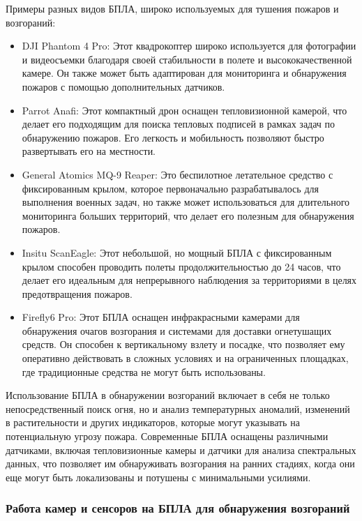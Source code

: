 Примеры разных видов БПЛА, широко используемых для тушения пожаров и возгораний:
\begin{itemize}
	\item DJI Phantom 4 Pro: Этот квадрокоптер широко используется для фотографии и видеосъемки благодаря своей стабильности в полете и высококачественной камере. Он также может быть адаптирован для мониторинга и обнаружения пожаров с помощью дополнительных датчиков.
	\item Parrot Anafi: Этот компактный дрон оснащен тепловизионной камерой, что делает его подходящим для поиска тепловых подписей в рамках задач по обнаружению пожаров. Его легкость и мобильность позволяют быстро развертывать его на местности.
	\item General Atomics MQ-9 Reaper: Это беспилотное летательное средство с фиксированным крылом, которое первоначально разрабатывалось для выполнения военных задач, но также может использоваться для длительного мониторинга больших территорий, что делает его полезным для обнаружения пожаров.
	\item Insitu ScanEagle: Этот небольшой, но мощный БПЛА с фиксированным крылом способен проводить полеты продолжительностью до 24 часов, что делает его идеальным для непрерывного наблюдения за территориями в целях предотвращения пожаров.
	\item Firefly6 Pro: Этот БПЛА оснащен инфракрасными камерами для обнаружения очагов возгорания и системами для доставки огнетушащих средств. Он способен к вертикальному взлету и посадке, что позволяет ему оперативно действовать в сложных условиях и на ограниченных площадках, где традиционные средства не могут быть использованы.
\end{itemize}

Использование БПЛА в обнаружении возгораний включает в себя не только непосредственный поиск огня, но и анализ температурных аномалий, изменений в растительности и других индикаторов, которые могут указывать на потенциальную угрозу пожара. Современные БПЛА оснащены различными датчиками, включая тепловизионные камеры и датчики для анализа спектральных данных, что позволяет им обнаруживать возгорания на ранних стадиях, когда они еще могут быть локализованы и потушены с минимальными усилиями.
\subsubsection{Работа камер и сенсоров на БПЛА для обнаружения возгораний}
